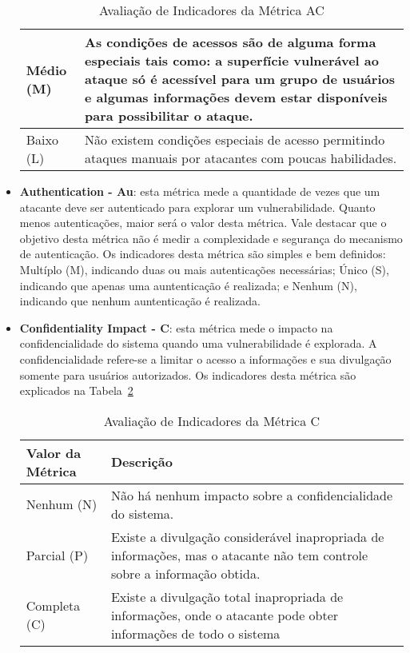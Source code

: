\begin{itemize}
\begin{table}[H]
\begin{center}
\begin{tabular}{ | l | p{10cm} |}
	    Médio (M) & As condições de acessos são de alguma forma especiais tais como: a superfície vulnerável ao ataque só é acessível para um grupo de usuários e algumas informações devem estar disponíveis para possibilitar o ataque. \\ \hline
	    Baixo (L) & Não existem condições especiais de acesso permitindo ataques manuais por atacantes com poucas habilidades.\\ \hline
	    \end{tabular}
	    \caption{Avaliação de Indicadores da Métrica AC}
	    \label{tab:ac_scoring}
	\end{center}
	\end{table}
\item \textbf{Authentication - Au}: esta métrica mede a quantidade de vezes que um atacante deve ser autenticado para explorar um vulnerabilidade. Quanto menos autenticações, maior será o valor desta métrica. Vale destacar que o objetivo desta métrica não é medir a complexidade e segurança do mecanismo de autenticação. Os indicadores desta métrica são simples e bem definidos: Multíplo (M), indicando duas ou mais autenticações necessárias; Único (S), indicando que apenas uma auntenticação é realizada; e Nenhum (N), indicando que nenhum auntenticação é realizada.
\item \textbf{Confidentiality Impact - C}: esta métrica mede o impacto na confidencialidade do sistema quando uma vulnerabilidade é explorada. A confidencialidade refere-se a limitar o acesso a informações e sua divulgação somente para usuários autorizados. Os indicadores desta métrica são explicados na Tabela~\ref{tab:c_scoring}
	\begin{table}[H]
	\begin{center}
	    \begin{tabular}{ | l | p{10cm} |}
	    \hline
	    Valor da Métrica & Descrição \\ \hline
	    Nenhum (N) & Não há nenhum impacto sobre a confidencialidade do sistema. \\ \hline
	    Parcial (P) & Existe a divulgação considerável inapropriada de informações, mas o atacante não tem controle sobre a informação obtida.  \\ \hline
	    Completa (C) & Existe a divulgação total inapropriada de informações, onde o atacante pode obter informações de todo o sistema\\ \hline
	    \end{tabular}
	    \caption{Avaliação de Indicadores da Métrica C}
	    \label{tab:c_scoring}

\end{center}
\end{table}
\end{itemize}
